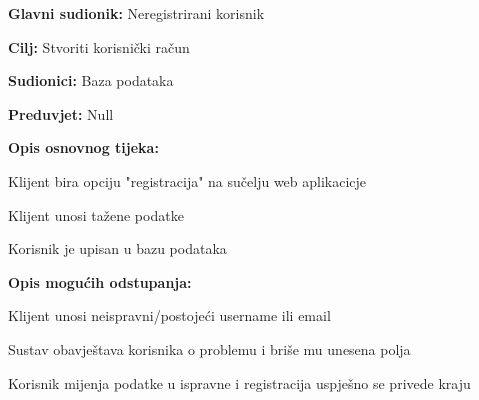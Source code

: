					\noindent {}
					\begin{packed_item}
	
						\item \textbf{Glavni sudionik: }Neregistrirani korisnik
						\item  \textbf{Cilj:} Stvoriti korisnički račun
						\item  \textbf{Sudionici:} Baza podataka
						\item  \textbf{Preduvjet:} Null
						\item  \textbf{Opis osnovnog tijeka:}
						
						\item[] \begin{packed_enum}
	
							\item Klijent bira opciju "registracija" na sučelju web aplikacicje
							\item Klijent unosi tažene podatke
							\item Korisnik je upisan u bazu podataka
						\end{packed_enum}
						
						\item  \textbf{Opis mogućih odstupanja:}
						
						\item[] \begin{packed_item}
	
							\item[2.a] Klijent unosi neispravni/postojeći username ili email
							\item[] \begin{packed_enum}
								
								\item Sustav obavještava korisnika o problemu i briše mu unesena polja
								
								\item Korisnik mijenja podatke u ispravne i registracija uspješno se privede kraju
								
							\end{packed_enum}
							
						\end{packed_item}
					\end{packed_item}
					
